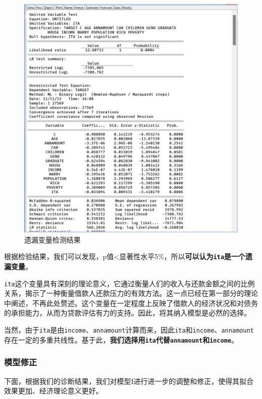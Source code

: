 \documentclass[13.5pt,hyperref,a4paper,UTF8]{ctexart}
\begin{document}
\begin{figure}[H]
    \centering
    \includegraphics[width=1\linewidth]{figures//3回归//回归1/遗漏变量ita结果.png}
    \caption{遗漏变量检测结果}
    \label{遗漏变量检测结果模型1}
\end{figure}

根据检验结果，我们可以发现，p值<显著性水平5\%，所以\textbf{可以认为\texttt{ita}是一个遗漏变量}。

\texttt{ita}这个变量具有深刻的理论意义，它通过衡量人们的收入与还款金额之间的比例关系，揭示了一种衡量借款人还款压力的有效方法。这一点已经在第一部分的理论中阐述，不再此处赘述。这个变量在一定程度上反映了借款人的经济状况和对债务的承担能力，从而为贷款评估有力的支持。因此，将其纳入模型是必然的选择。

当然，由于\texttt{ita}是由\texttt{income}、\texttt{annamount}计算而来，因此\texttt{ita}和\texttt{income}、\texttt{annamount}存在一定的多重共线性。基于此，\textbf{我们选择用\texttt{ita}代替\texttt{annamount}和\texttt{income}}。


\subsubsection{模型修正}

下面，根据我们的诊断结果，我们对模型I进行进一步的调整和修正，使得其拟合效果更加、经济理论意义更好。
\end{document}
